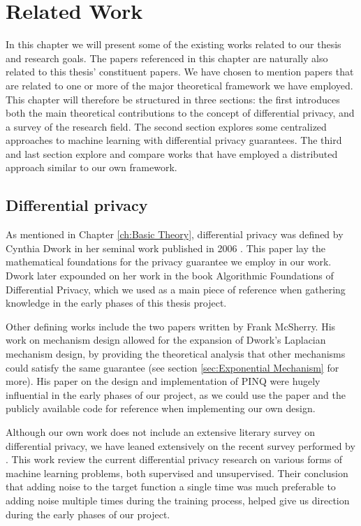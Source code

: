 
\chapter{Related Work} \label{ch:Related Work}

In this chapter we will present some of the existing works related to our thesis and research goals. The papers referenced in this chapter are naturally also related to this thesis' constituent papers. We have chosen to mention papers that are related to one or more of the major theoretical framework we have employed. This chapter will therefore be structured in three sections: the first introduces both the main theoretical contributions to the concept of differential privacy, and a survey of the research field. The second section explores some centralized approaches to machine learning with differential privacy guarantees. The third and last section explore and compare works that have employed a distributed approach similar to our own framework.   

\section{Differential privacy}
As mentioned in Chapter \ref{ch:Basic Theory}, differential privacy was defined by Cynthia Dwork in her seminal work published in 2006 \citep{Dwork06differentialprivacy}. This paper lay the mathematical foundations for the privacy guarantee we employ in our work. Dwork later expounded on her work in the book Algorithmic Foundations of Differential Privacy\citep{dwork2013algorithmic}, which we used as a main piece of reference when gathering knowledge in the early phases of this thesis project.

Other defining works include the two papers written by Frank McSherry. His work on mechanism design \citep{mcsherry2007} allowed for the expansion of Dwork's Laplacian mechanism design, by providing the theoretical analysis that other mechanisms could satisfy the same guarantee (see section \ref{sec:Exponential Mechanism} for more). His paper \citep{mcsherry2009PINQ} on the design and implementation of PINQ were hugely influential in the early phases of our project, as we could use the paper and the publicly available code for reference when implementing our own design. 

Although our own work does not include an extensive literary survey on differential privacy, we have leaned extensively on the recent survey performed by \cite{ji2014differential}. This work review the current differential privacy research on various forms of machine learning problems, both supervised and unsupervised. Their conclusion that adding noise to the target function a single time was much preferable to adding noise multiple times during the training process, helped give us direction during the early phases of our project.  

